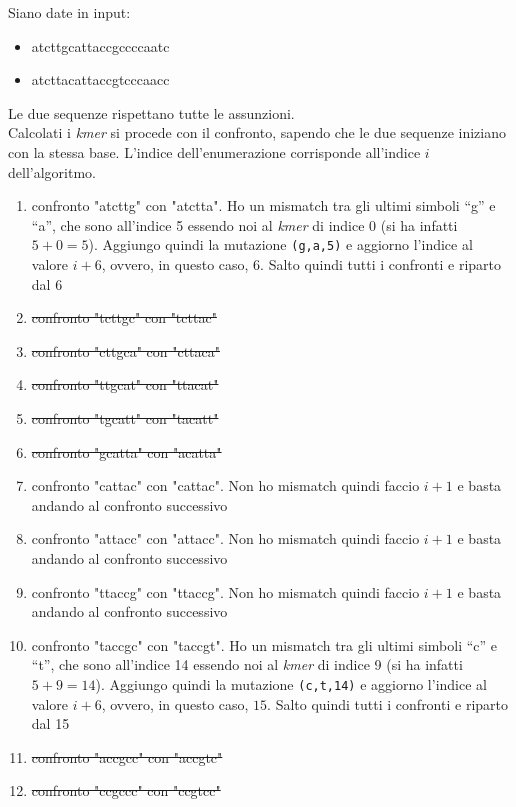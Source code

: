 \documentclass[a4paper,12pt, oneside]{book}
\begin{document}
\begin{esempio}
  Siano date in input:
  \begin{itemize}
    \item atcttgcattaccgccccaatc
    \item atcttacattaccgtcccaacc
  \end{itemize}
  Le due sequenze rispettano tutte le assunzioni.\\
  Calcolati i \textit{kmer} si procede con il confronto, sapendo che le due
  sequenze iniziano con la stessa base. L'indice dell'enumerazione corrisponde
  all'indice $i$ dell'algoritmo.
  \begin{enumerate}[start=0]
    \item confronto "atcttg" con "atctta". Ho un mismatch tra gli ultimi simboli
    ``g'' e ``a'', che sono all'indice 5 essendo noi al \textit{kmer} di indice
    0 (si ha infatti $5+0=5$). Aggiungo quindi la mutazione \texttt{(g,a,5)}
    e aggiorno l'indice al valore $i+6$, ovvero, in questo caso, $6$. Salto
    quindi tutti i confronti e riparto dal 6
    \item \sout{confronto "tcttgc" con "tcttac"}
    \item \sout{confronto "cttgca" con "cttaca"}
    \item \sout{confronto "ttgcat" con "ttacat"}
    \item \sout{confronto "tgcatt" con "tacatt"}
    \item \sout{confronto "gcatta" con "acatta"}
    \item confronto "cattac" con "cattac". Non ho mismatch quindi faccio $i+1$ e
    basta andando al confronto successivo
    \item confronto "attacc" con "attacc". Non ho mismatch quindi faccio $i+1$ e
    basta andando al confronto successivo
    \item confronto "ttaccg" con "ttaccg". Non ho mismatch quindi faccio $i+1$ e
    basta andando al confronto successivo
    \item confronto "taccgc" con "taccgt". Ho un mismatch tra gli ultimi simboli
    ``c'' e ``t'', che sono all'indice 14 essendo noi al \textit{kmer} di indice
    9 (si ha infatti $5+9=14$). Aggiungo quindi la mutazione
    \texttt{(c,t,14)} 
    e aggiorno l'indice al valore $i+6$, ovvero, in questo caso, $15$. Salto
    quindi tutti i confronti e riparto dal 15
    \item \sout{confronto "accgcc" con "accgtc"}
    \item \sout{confronto "ccgccc" con "ccgtcc"}

\end{enumerate}
\end{esempio}
\end{document}
